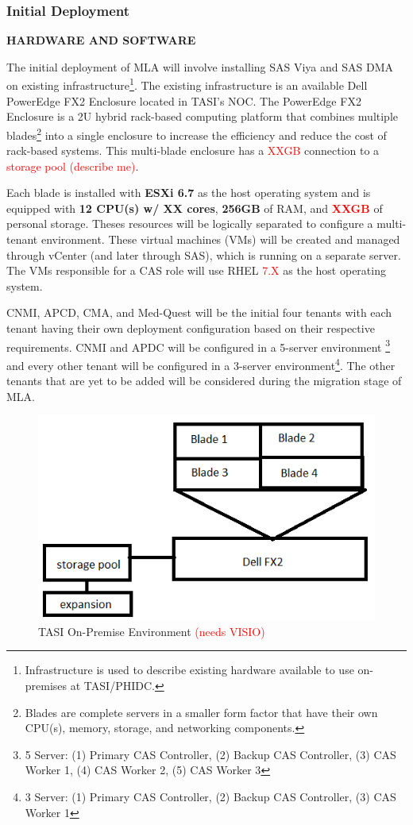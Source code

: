 \subsubsection{Initial Deployment}
\textbf{HARDWARE AND SOFTWARE}

The initial deployment of MLA will involve installing SAS Viya and SAS DMA on existing infrastructure\footnote{Infrastructure is used to describe existing hardware available to use on-premises at TASI/PHIDC.}. The existing infrastructure is  an available Dell PowerEdge FX2 Enclosure located in TASI's NOC. The PowerEdge FX2 Enclosure is a 2U hybrid rack-based computing platform that combines multiple blades\footnote{Blades are complete servers in a smaller form factor that have their own CPU(s), memory, storage, and networking components.} into a single enclosure to increase the efficiency and reduce the cost of rack-based systems. This multi-blade enclosure has a \textcolor{red}{XXGB} connection to a \textcolor{red}{storage pool (describe me)}.

Each blade is installed with \textbf{ESXi 6.7} as the host operating system and is equipped with \textbf{12 CPU(s) w/ XX cores}, \textbf{256GB} of RAM, and \textcolor{red}{\textbf{XXGB}} of personal storage. Theses resources will be logically separated to configure a multi-tenant environment. These virtual machines (VMs) will be created and managed through vCenter (and later through SAS), which is running on a separate server. The VMs responsible for a CAS role will use RHEL \textcolor{red}{7.X} as the host operating system. 

CNMI, APCD, CMA, and Med-Quest will be the initial four tenants with each tenant having their own  deployment configuration based on their respective requirements. CNMI and APDC will be configured in a 5-server environment \footnote{5 Server: (1) Primary CAS Controller, (2) Backup CAS Controller, (3) CAS Worker 1, (4) CAS Worker 2, (5) CAS Worker 3} and every other tenant will be configured in a 3-server environment\footnote{3 Server: (1) Primary CAS Controller, (2) Backup CAS Controller, (3) CAS Worker 1}. The other tenants that are yet to be added will be considered during the migration stage of MLA. 

\begin{figure}[H]
    \centering
    \includegraphics[scale = 0.75]{images/currentENV.png}
    \caption{TASI On-Premise Environment \textcolor{red}{(needs VISIO)} }
    \label{Current ENV}
\end{figure}

